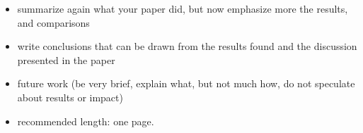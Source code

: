 \documentclass[]{nsm-thesis}
\begin{document}
\begin{itemize}
\item summarize again what your paper did, but now emphasize more the results, and comparisons
\item write conclusions that can be drawn from the results found and the discussion presented in the paper
\item future work (be very brief, explain what, but not much how, do not speculate about results or impact)
\item recommended length: one page.
\end{itemize}



\cleardoublepage

\listofabbreviations
\clearpage

\listoffigures
\clearpage

\listoftables
\clearpage

\printbibliography
\end{document}
